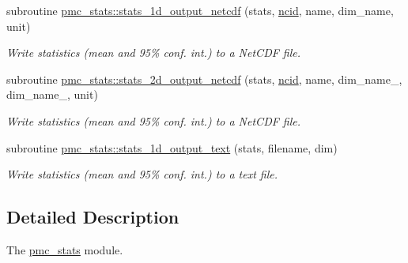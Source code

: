\begin{DoxyCompactItemize}
subroutine \mbox{\hyperlink{namespacepmc__stats_a644ef48950c748f3ab3a3d9276186c21}{pmc\+\_\+stats\+::stats\+\_\+1d\+\_\+output\+\_\+netcdf}} (stats, \mbox{\hyperlink{fractal_8_f90_a4e89f3f850921ff84a6dfce8b166ad50}{ncid}}, name, dim\+\_\+name, unit)
\begin{DoxyCompactList}\small\item\em Write statistics (mean and 95\% conf. int.) to a Net\+C\+DF file. \end{DoxyCompactList}\item 
subroutine \mbox{\hyperlink{namespacepmc__stats_ad17733f0597dca5b088f1f4b6d99ded8}{pmc\+\_\+stats\+::stats\+\_\+2d\+\_\+output\+\_\+netcdf}} (stats, \mbox{\hyperlink{fractal_8_f90_a4e89f3f850921ff84a6dfce8b166ad50}{ncid}}, name, dim\+\_\+name\+\_, dim\+\_\+name\+\_, unit)
\begin{DoxyCompactList}\small\item\em Write statistics (mean and 95\% conf. int.) to a Net\+C\+DF file. \end{DoxyCompactList}\item 
subroutine \mbox{\hyperlink{namespacepmc__stats_a64f09d5c5d2f28d8e7351b5cc14a9848}{pmc\+\_\+stats\+::stats\+\_\+1d\+\_\+output\+\_\+text}} (stats, filename, dim)
\begin{DoxyCompactList}\small\item\em Write statistics (mean and 95\% conf. int.) to a text file. \end{DoxyCompactList}\end{DoxyCompactItemize}


\subsection{Detailed Description}
The \mbox{\hyperlink{namespacepmc__stats}{pmc\+\_\+stats}} module. 

